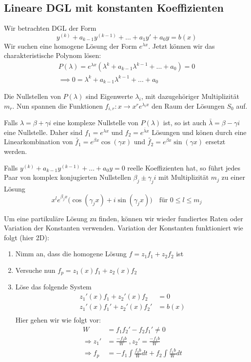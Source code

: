 \documentclass[a4paper,10pt]{article}
\begin{document}
\subsection{Lineare DGL mit konstanten Koeffizienten}
Wir betrachten DGL der Form
\[y^{(k)} + a_{k-1} y^{(k-1)} + \ldots + a_1 y' + a_0 y = b(x)\]
Wir suchen eine homogene Lösung der Form \(e^{\lambda x}\). Jetzt können wir das charakteristische Polynom lösen:
\begin{align*}
  P(\lambda) = e^{\lambda x} \left(\lambda^k + a_{k-1}\lambda^{k-1} + \ldots + a_0\right) = 0 \\ 
  \implies 0 = \lambda^k + a_{k-1}\lambda^{k-1} + \ldots+ a_0
\end{align*}

Die Nullstellen von \(P(\lambda)\) sind Eigenwerte \(\lambda_i\), mit dazugehöriger Multiplizität \(m_r\). Nun spannen die Funktionen \(f_{i,r} : x \to x^r e^{\lambda_i x}\) den Raum der Lösungen \(S_0\) auf.

Falls \(\lambda = \beta + \gamma i\) eine komplexe Nullstelle von \(P(\lambda)\) ist, so ist auch 
\(\bar{\lambda} = \beta - \gamma i\) eine Nullstelle. Daher sind \(f_1 = e^{\lambda x}\) und \(f_2 = e^{\bar{\lambda} x}\) Lösungen und könen durch eine Linearkombination von \(\tilde{f_1} = e^{\beta x} \cos(\gamma x)\) und \(\tilde{f_2} = e^{\beta x} \sin(\gamma x)\) ersetzt werden.

Falls \(y^{(k)} + a_{k-1}y^{(k-1)} + \dots + a_0 y = 0\) reelle Koeffizienten hat, so führt jedes Paar von komplex konjugierten Nullstellen $\beta_j \pm \gamma_j i$ mit Multiplizität $m_j$ zu einer Lösung
\[x^l e^{\beta_j x} \Big( \cos(\gamma_j x) + i \sin(\gamma_j x) \Big) \quad \text{für }0 \leq l \leq m_j\]

Um eine partikuläre Lösung zu finden, können wir wieder fundiertes Raten oder Variation der Konstanten verwenden. 
Variation der Konstanten funktioniert wie folgt (hier 2D):

\begin{enumerate}[label=(\arabic*)]
  \item Nimm an, dass die homogene Lösung \(f = z_1 f_1 + z_2 f_2\) ist
  \item Versuche nun \(f_p = z_1(x) f_1 + z_2(x) f_2\)
  \item Löse das folgende System
  \begin{align*}
    z_1'(x) f_1 + z_2'(x) f_2 &= 0\\
    z_1'(x) f_1' + z_2'(x) f_2' &= b(x)\\
  \end{align*}
  Hier gehen wir wie folgt vor:
  \begin{align*}
    W &= f_1 f_2' - f_2 f_1' \neq 0\\
    \Rightarrow z_1' &= \frac{-f_2 b}{W} \; , z_2' = \frac{-f_1 b}{W}\\
    \Rightarrow f_p &= -f_1 \int \frac{f_2 b}{W} dt + f_2 \int \frac{f_1 b}{W} dt
  \end{align*}
\end{enumerate}
\end{document}

